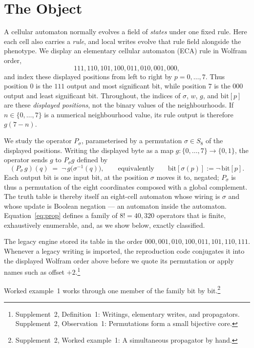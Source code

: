 \documentclass[man,12pt,floatsintext,donotrepeattitle]{apa7}
\newcommand{\sig}{\sigma}
\newcommand{\bit}[1]{\mathrm{bit}[#1]}
\newcommand{\supptheorytext}[2]{Supplement~2, #1: #2.}
\newcommand{\supptheory}[2]{\footnote{\supptheorytext{#1}{#2}}}
\newcommand{\suppnote}[1]{\footnote{#1}}
\begin{document}
\label{part:core}

\section{The Object}
\label{sec:object}

A cellular automaton normally evolves a field of \emph{states} under one
fixed rule. Here each cell also carries a \emph{rule}, and local writes evolve
that rule field alongside the phenotype. We display an elementary cellular
automaton (ECA) rule in Wolfram order,
\[
111,110,101,100,011,010,001,000,
\]
and index these displayed positions from left to right by $p=0,\ldots,7$.
Thus position $0$ is the $111$ output and most significant bit, while position
$7$ is the $000$ output and least significant bit. Throughout, the indices of
$\sig$, $w$, $g$, and $\bit{p}$ are these \emph{displayed positions}, not the
binary values of the neighbourhoods. If $n\in\{0,\ldots,7\}$ is a numerical
neighbourhood value, its rule output is therefore $g(7-n)$.

We study the operator $P_\sig$, parameterised by a permutation
$\sig\in S_8$ of the displayed positions. Writing the displayed byte as a map
$g\colon\{0,\dots,7\}\to\{0,1\}$, the operator sends $g$ to $P_\sig g$ defined by
\begin{equation}
(P_\sig\, g)(q) \;=\; \lnot\, g\bigl(\sig^{-1}(q)\bigr),
\qquad\text{equivalently}\qquad \bit{\sig(p)} := \lnot\,\bit{p}.
\label{eq:prop}
\end{equation}
Each output bit is one input bit, at the position $\sig$ moves it to, negated;
$P_\sig$ is thus a permutation of the eight coordinates composed with a global
complement. The truth table is thereby itself an eight-cell automaton whose
wiring is $\sig$ and whose update is Boolean negation --- an automaton inside
the automaton. Equation~\eqref{eq:prop} defines a family of $8! = 40{,}320$
operators that is finite, exhaustively enumerable, and, as we show below,
exactly classified.

The legacy engine stored its table in the order
$000,001,010,100,011,101,110,111$. Whenever a legacy writing is imported, the
reproduction code conjugates it into the displayed Wolfram order above before
we quote its permutation or apply names such as offset $+2$.\suppnote{\supptheorytext{Definition~1}{Writings, elementary writes, and propagators} \supptheorytext{Observation~1}{Permutations form a small bijective core}}

Worked example~1 works through one member of the
family bit by bit.\supptheory{Worked example~1}{A simultaneous propagator by hand}
\end{document}
